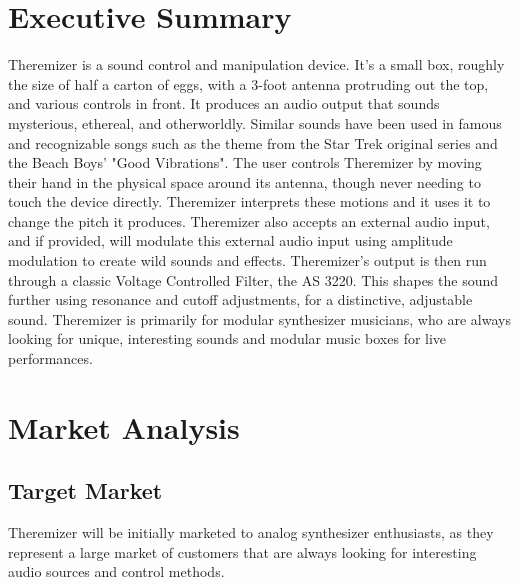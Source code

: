 \documentclass[a4paper,12pt]{article}
\begin{document}




\newpage
{}

	\section*{Executive Summary}
	Theremizer is a sound control and manipulation device. It's a small box, roughly the size of half a carton of eggs, with a 3-foot antenna protruding out the top, and various controls in front. It produces an audio output that sounds mysterious, ethereal, and otherworldly. Similar sounds have been used in famous and recognizable songs such as the theme from the Star Trek original series and the Beach Boys' "Good Vibrations". The user controls Theremizer by moving their hand in the physical space around its antenna, though never needing to touch the device directly. Theremizer interprets these motions and it uses it to change the pitch it produces. Theremizer also accepts an external audio input, and if provided, will modulate this external audio input using amplitude modulation to create wild sounds and effects. Theremizer's output is then run through a classic Voltage Controlled Filter, the AS 3220. This shapes the sound further using resonance and cutoff adjustments, for a distinctive, adjustable sound. Theremizer is primarily for modular synthesizer musicians, who are always looking for unique, interesting sounds and modular music boxes for live performances.
	\section*{Market Analysis}
	\subsection*{Target Market}
	Theremizer will be initially marketed to analog synthesizer enthusiasts, as they represent a large market of customers that are always looking for interesting audio sources and control methods. 
\end{document}
